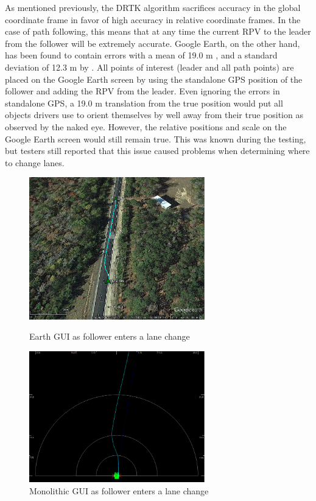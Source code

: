 As mentioned previously, the DRTK algorithm sacrifices accuracy in the global coordinate frame in favor of high accuracy in relative coordinate frames. In the case of path following, this means that at any time the current RPV to the leader from the follower will be extremely accurate. 
Google Earth, on the other hand, has been found to contain errors with a mean of 19.0 m , and a standard deviation of 12.3 m by \cite{ge_accuracy}. All points of interest (leader and all path points) are placed on the Google Earth screen by using the standalone GPS position of the follower and adding the RPV from the leader. Even ignoring the errors in standalone GPS, a 19.0 m translation from the true position would put all objects drivers use to orient themselves by well away from their true position as observed by the naked eye. However, the relative positions and scale on the Google Earth screen would still remain true. This was known during the testing, but testers still reported that this issue caused problems when determining where to change lanes.

\begin{figure}[ht] \centering
    \begin{minipage}[b]{0.45\linewidth} \centering 
        \includegraphics[width=3in]{./figs/lane_change.png}
        \caption{Earth GUI as follower enters a lane change} \label{fig:lanechange_earth}
    \end{minipage}
    \hspace{0.5cm}
    \begin{minipage}[b]{0.45\linewidth} \centering
        \includegraphics[width=3in]{./figs/lane_change_mono.png}
        \caption{Monolithic GUI as follower enters a lane change} \label{fig:lanechange_mono}
    \end{minipage}
\end{figure}



